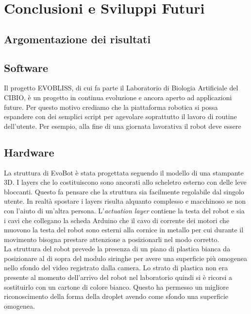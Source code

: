 \chapter{Conclusioni e Sviluppi Futuri}
\vspace{0.5cm}
\label{cha:789}

\section{Argomentazione dei risultati}

\section{Software}
Il progetto EVOBLISS, di cui fa parte il Laboratorio di Biologia Artificiale del CIBIO, è un progetto in continua evoluzione e ancora aperto ad applicazioni future. Per questo motivo crediamo che la piattaforma robotica si possa espandere con dei semplici script per agevolare soprattutto il lavoro di routine dell'utente. Per esempio, alla fine di una giornata lavorativa il robot deve essere 
\section{Hardware}
La struttura di EvoBot è stata progettata seguendo il modello di una stampante 3D. I layers che lo costituiscono sono ancorati allo scheletro esterno con delle leve bloccanti. Questo fa pensare che la struttura sia facilmente regolabile dal singolo utente. In realtà spostare i layers risulta alquanto complesso e macchinoso se non con l'aiuto di un'altra persona. L'\emph{actuation layer} contiene la testa del robot e sia i cavi che collegano la scheda Arduino che il cavo di corrente dei motori che muovono la testa del robot sono esterni alla cornice in metallo per cui durante il movimento bisogna prestare attenzione a posizionarli nel modo corretto.
\\La struttura del robot prevede la presenza di un piano di plastica bianca da posizionare al di sopra del modulo siringhe per avere una superficie più omogenea nello sfondo del video registrato dalla camera. Lo strato di plastica non era presente al momento dell'arrivo del robot nel laboratorio quindi si è ricorsi a sostituirlo con un cartone di colore bianco. Questo ha permesso un migliore riconoscimento della forma della droplet avendo come sfondo una superficie omogenea. 

